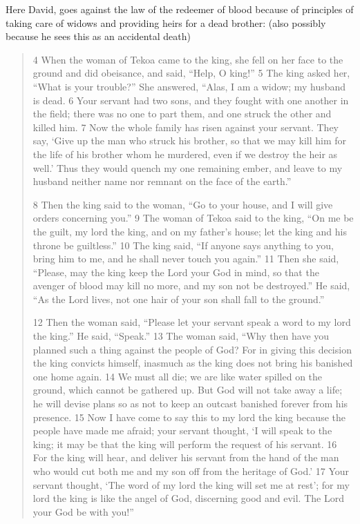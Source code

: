 \documentclass[11pt]{article}
\begin{document}
Here David, goes against the law of the redeemer of blood because of principles of taking care of widows and providing heirs for a dead brother: (also possibly because he sees this as an accidental death)
\begin{quote}
4 When the woman of Tekoa came to the king, she fell on her face to the ground and did obeisance, and said, “Help, O king!” 5 The king asked her, “What is your trouble?” She answered, “Alas, I am a widow; my husband is dead. 6 Your servant had two sons, and they fought with one another in the field; there was no one to part them, and one struck the other and killed him. 7 Now the whole family has risen against your servant. They say, ‘Give up the man who struck his brother, so that we may kill him for the life of his brother whom he murdered, even if we destroy the heir as well.’ Thus they would quench my one remaining ember, and leave to my husband neither name nor remnant on the face of the earth.”

8 Then the king said to the woman, “Go to your house, and I will give orders concerning you.” 9 The woman of Tekoa said to the king, “On me be the guilt, my lord the king, and on my father’s house; let the king and his throne be guiltless.” 10 The king said, “If anyone says anything to you, bring him to me, and he shall never touch you again.” 11 Then she said, “Please, may the king keep the Lord your God in mind, so that the avenger of blood may kill no more, and my son not be destroyed.” He said, “As the Lord lives, not one hair of your son shall fall to the ground.”

12 Then the woman said, “Please let your servant speak a word to my lord the king.” He said, “Speak.” 13 The woman said, “Why then have you planned such a thing against the people of God? For in giving this decision the king convicts himself, inasmuch as the king does not bring his banished one home again. 14 We must all die; we are like water spilled on the ground, which cannot be gathered up. But God will not take away a life; he will devise plans so as not to keep an outcast banished forever from his presence. 15 Now I have come to say this to my lord the king because the people have made me afraid; your servant thought, ‘I will speak to the king; it may be that the king will perform the request of his servant. 16 For the king will hear, and deliver his servant from the hand of the man who would cut both me and my son off from the heritage of God.’ 17 Your servant thought, ‘The word of my lord the king will set me at rest’; for my lord the king is like the angel of God, discerning good and evil. The Lord your God be with you!”


\end{quote}
\end{document}
